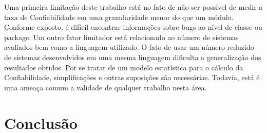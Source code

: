 \documentclass[12pt]{article}
\begin{document}
Uma primeira limitação deste trabalho está no fato de não ser possível de medir
a taxa de Confiabilidade em uma granularidade menor do que um módulo. Conforme
exposto, é difícil encontrar informações sobre bugs ao nível de classe ou
package. Um outro fator limitador está relacionado ao número de sistemas
avaliados bem como a linguagem utilizado. O fato de usar um número reduzido de
sistemas desenvolvidos em uma mesma linguagem dificulta a generalização dos
resultados obtidos. Por se tratar de um modelo estatística para o cálculo da
Confiabilidade, simplificações e outras suposições são necessárias. Todavia,
está é uma ameaça comum a validade de qualquer trabalho nesta área.

\section{Conclusão}
\label{sec:conclusao}



\end{document}
